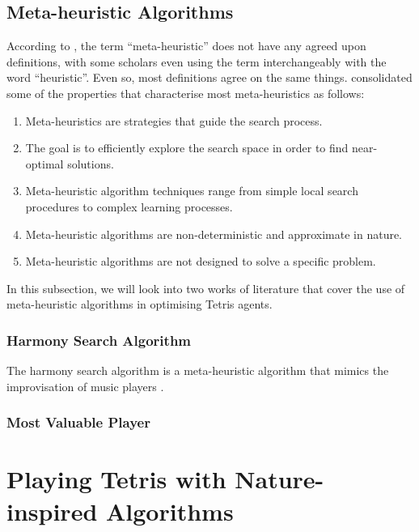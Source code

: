 \documentclass[a4paper, 12pt]{extreport}
\begin{document}
			\subsection{Meta-heuristic Algorithms}
				
				
				According to \citeauthor{yang2020nature} \cite{yang2020nature}, the term ``meta-heuristic'' does not have any agreed upon definitions, with some scholars even using the term interchangeably with the word ``heuristic''. Even so, most definitions agree on the same things. \citeauthor{metaheuristic} \cite{metaheuristic} consolidated some of the properties that characterise most meta-heuristics as follows:
				
				\begin{enumerate}
					\item Meta-heuristics are strategies that guide the search process.
					\item The goal is to efficiently explore the search space in order to find near-optimal solutions.
					\item Meta-heuristic algorithm techniques range from simple local search procedures to complex learning processes.
					\item Meta-heuristic algorithms are non-deterministic and approximate in nature.
					\item Meta-heuristic algorithms are not designed to solve a specific problem.
				\end{enumerate}
				
				In this subsection, we will look into two works of literature that cover the use of meta-heuristic algorithms in optimising Tetris agents.
				
				\subsubsection{Harmony Search Algorithm}
				
					The harmony search algorithm is a meta-heuristic algorithm that mimics the improvisation of music players \cite{harmony-search}.
				
				\subsubsection{Most Valuable Player}
						
		\section{Playing Tetris with Nature-inspired Algorithms}
		
\end{document}
